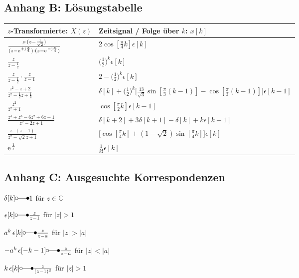 \documentclass[11pt,a4paper,DIV=12]{scrartcl}
\begin{document}
\newpage
\subsection{Anhang B: Lösungstabelle}
\label{sec:AnhangB}
\begin{center}
	\begin{tabular}{|l|l|}
		\hline
		$z$-Transformierte: ${X(z)}$ & Zeitsignal / Folge über $k$: $x[k]$ \\
		\hline
		$\frac{z\cdot(z-\frac{1}{\sqrt{2}})}{(z-\e^{+\im\frac{\pi}{4}})\cdot(z-\e^{-\im\frac{\pi}{4}})}$ & $2\cos[\frac{\pi}{4}k]\epsilon[k]$ \\
		\hline
		$\frac{z}{z-\frac{1}{2}}$ & $\bigg (\frac{1}{2} \bigg)^{k}\epsilon[k]$ \\
		\hline
		$\frac{z}{z-\frac{1}{2}}\cdot\frac{z}{z-1} $ & $2-\bigg(\frac{1}{2}\bigg)^k\epsilon[k] $\\[2ex]
		\hline
		$\frac{z^2-z+2}{z^2-\frac{1}{2}z+\frac{1}{4}}$ & $\delta[k]+\bigg(\frac{1}{2}\bigg)^k\Bigg[\frac{13}{\sqrt{3}}\sin[\frac{\pi}{3}(k-1)]-\cos[\frac{\pi}{3}(k-1)]\Bigg]\epsilon[k-1]$ \\
		\hline
		$\frac{z^2}{z^2+1}$ & $\cos[\frac{\pi}{2}k]\epsilon[k-1]$\\
		\hline
		$\frac{z^4+z^3-6z^2+6z-1}{z^2-2z+1}$ & $\delta[k+2]+3\delta[k+1]-\delta[k]+k\epsilon[k-1]$\\
		\hline
		$\frac{z\cdot(z-1)}{z^2-\sqrt{2}z+1}$ & $\Bigg[\cos[\frac{\pi}{4}k]+(1-\sqrt{2})\sin[\frac{\pi}{4}k]\Bigg] \epsilon[k]$\\
		\hline
		$\e^{\frac{1}{z}}$ & $\frac{1}{k!}\epsilon[k]$ \\
		\hline
	\end{tabular}
\end{center}


\subsection{Anhang C: Ausgesuchte Korrespondenzen}
\label{sec:AnhangC}

\noindent $\delta[k] \laplace 1$ für $z \in \mathbb{C}$

\noindent $\epsilon[k] \laplace \frac{z}{z-1}$  für $|z| > 1$

\noindent $a^k \, \epsilon[k] \laplace \frac{z}{z-a}$ für $|z| > |a|$

\noindent $-a^k \, \epsilon[-k-1] \laplace \frac{z}{z-a}$ für $|z| < |a|$

\noindent $k \, \epsilon[k] \laplace \frac{z}{(z-1)^2}$ für $|z| > 1$
\end{document}
